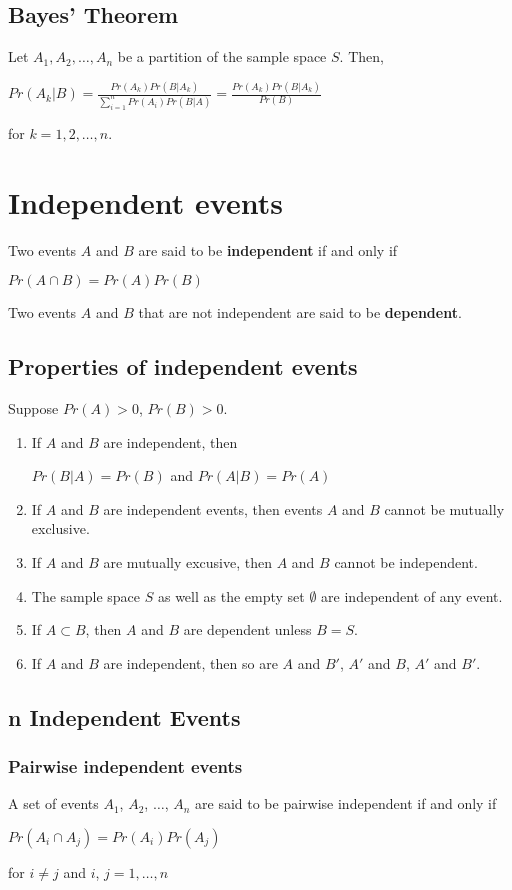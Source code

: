 \documentclass[a4paper]{article}
\begin{document}
\subsection{Bayes' Theorem}
Let $A_1, A_2, \dots, A_n$ be a partition of the sample space $S$. Then,
\begin{center}
	$Pr(A_k|B) = \frac{Pr(A_k)Pr(B|A_k)}{\sum_{i=1}^{n}Pr(A_i)Pr(B|A)} = \frac{Pr(A_k)Pr(B|A_k)}{Pr(B)}$
\end{center}
for $k = 1, 2, \dots, n$.

\section{Independent events}
Two events $A$ and $B$ are said to be \textbf{independent} if and only if 
\begin{center}
	$Pr(A\cap B) = Pr(A)Pr(B)$
\end{center}
Two events $A$ and $B$ that are not independent are said to be \textbf{dependent}.
\subsection{Properties of independent events}

Suppose $Pr(A)>0$, $Pr(B)>0$.
\begin{enumerate}
	\item If $A$ and $B$ are independent, then
	\begin{center}
		$Pr(B|A) = Pr(B)$ and $Pr(A|B) = Pr(A)$
	\end{center}
	\item If $A$ and $B$ are independent events, then events $A$ and $B$ cannot be mutually exclusive.
	\item If $A$ and $B$ are mutually excusive, then $A$ and $B$ cannot be independent.
	\item The sample space $S$ as well as the empty set $\emptyset$ are independent of any event.
	\item If $A \subset B$, then $A$ and $B$ are dependent unless $B = S$.
	\item If $A$ and $B$ are independent, then so are $A$ and $B'$, $A'$ and $B$, $A'$ and $B'$.
\end{enumerate}
\subsection{n Independent Events}
\subsubsection{Pairwise independent events}
A set of events $A_1$, $A_2$, $\dots$, $A_n$ are said to be pairwise independent if and only if 
\begin{center}
	$Pr(A_i \cap A_j) = Pr(A_i)Pr(A_j)$
\end{center}
for $i\neq j$ and $i$, $j = 1,\dots,n$
\end{document}
